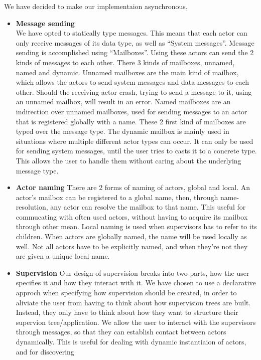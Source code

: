 \documentclass[a4paper]{article}
\begin{document}
We have decided to make our implementaion asynchronous, 
\begin{itemize}
\item \textbf{Message sending}\\
  We have opted to statically type messages. This means that each actor can only
  receive messages of its data type, as well as ``System messages''. Message
  sending is accomplished using ``Mailboxes''. Using these actors can
  send the 2 kinds of messages to each other. There 3 kinds of mailboxes,
  unnamed, named and dynamic. Unnamed mailboxes are the main kind of mailbox,
  which allows the actors to send system messages and data messages to each
  other. Should the receiving actor crash, trying to send a message to it, using
  an unnamed mailbox, will result in an error. Named mailboxes are an
  indirection over unnamed mailboxes, used for sending messages to an actor that
  is registered globally with a name. These 2 first kind of mailboxes are typed
  over the message type. The dynamic mailbox is mainly used in situations where
  multiple different actor types can occur. %
  It can only be used for sending system messages, until the user tries to casts
  it to a concrete type. This allows the user to handle them without caring
  about the underlying message type.
\item \textbf{Actor naming}
  There are 2 forms of naming of actors, global and local. An actor's mailbox
  can be registered to a global name, then, through name-resolution, any actor
  can resolve the mailbox to that name. This useful for commucating with often
  used actors, without having to acquire its mailbox through other mean. Local
  naming is used when supervisors has to refer to its children. When actors are
  globally named, the name will be used locally as well. Not all actors have to
  be explicitly named, and when they're not they are given a unique local name.
\item \textbf{Supervision}
  Our design of supervision breaks into two parts, how the user specifies it and
  how they interact with it. We have chosen to use a declarative approch when
  specifying how supervision should be created, in order to aliviate the user
  from having to think about how supervision trees are built. Instead, they only
  have to think about how they want to structure their supervion
  tree/application. We allow the user to interact with the supervisors through
  messages, so that they can establish contact between actors dynamically. This
  is useful for dealing with dynamic instantiaion of actors, and for discovering

\end{itemize}
\end{document}
